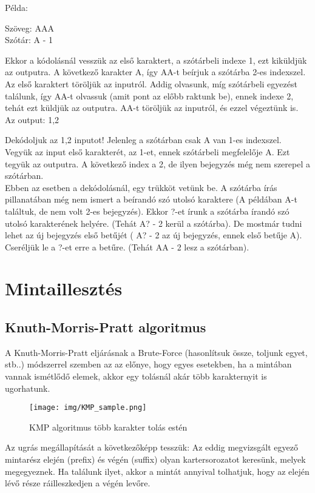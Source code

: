 \documentclass[margin=0px]{article}
\begin{document}
\begin{description}
        Példa:

        Szöveg: AAA\\
        Szótár: A - 1

        Ekkor a kódolásnál vesszük az első karaktert, a szótárbeli indexe 1, ezt kiküldjük az outputra. A következő karakter A, így AA-t beírjuk a szótárba 2-es indexszel. Az első karaktert töröljük az inputról. Addig olvasunk, míg szótárbeli egyezést találunk, így AA-t olvassuk (amit pont az előbb raktunk be), ennek indexe 2, tehát ezt küldjük az outputra. AA-t töröljük az inputról, és ezzel végeztünk is. Az output: 1,2

        Dekódoljuk az 1,2 inputot! Jelenleg a szótárban csak A van 1-es indexszel. Vegyük az input első karakterét, az 1-et, ennek szótárbeli megfelelője A. Ezt tegyük az outputra. A következő index a 2, de ilyen bejegyzés még nem szerepel a szótárban. \\

        Ebben az esetben a dekódolásnál, egy trükköt vetünk be. A szótárba írás pillanatában még nem ismert a beírandó szó utolsó karaktere (A példában A-t találtuk, de nem volt 2-es bejegyzés). Ekkor ?-et írunk a szótárba írandó szó utolsó karakterének helyére. (Tehát A? - 2 kerül a szótárba). De mostmár tudni lehet az új bejegyzés első betűjét ( A? - 2 az új bejegyzés, ennek első betűje A). Cseréljük le a ?-et erre a betűre. (Tehát AA - 2 lesz a szótárban).
\end{description}
\section{Mintaillesztés}
\subsection{Knuth-Morris-Pratt algoritmus}
A Knuth-Morris-Pratt eljárásnak a Brute-Force (hasonlítsuk össze, toljunk egyet, stb..) módszerrel szemben az az előnye, hogy egyes esetekben, ha a mintában vannak ismétlődő elemek, akkor egy tolásnál akár több karakternyit is ugorhatunk.

\begin{figure}[H]
    \centering
    \texttt{[image: img/KMP\_sample.png]}
    \caption{KMP algoritmus több karakter tolás estén}
    \label{fig:KMP_sample}
\end{figure}

Az ugrás megállapítását a következőképp tesszük: Az eddig megvizsgált egyező mintarész elején (prefix) és végén (suffix) olyan kartersorozatot keresünk, melyek megegyeznek. Ha találunk ilyet, akkor a mintát annyival tolhatjuk, hogy az elején lévő része ráilleszkedjen a végén levőre.
\end{document}
